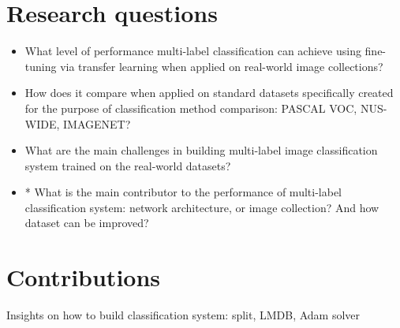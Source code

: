 \section{Research questions}
\begin{itemize}
    \item What level of performance multi-label classification can achieve using fine-tuning via transfer learning when applied on real-world image collections?
    \item How does it compare when applied on standard datasets specifically created for the purpose of classification method comparison: PASCAL VOC, NUS-WIDE, IMAGENET?
    \item What are the main challenges in building multi-label image classification system trained on the real-world datasets?
    \item * What is the main contributor to the performance of multi-label classification system: network architecture, or image collection? And how dataset can be improved?
\end{itemize}


\section{Contributions}
    
    Insights on how to build classification system: split, LMDB, Adam solver